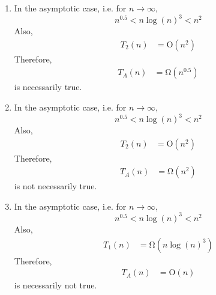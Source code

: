 \documentclass[fleqn, a4paper, 11pt, oneside]{amsart}
\theoremstyle{definition}
\theoremstyle{theorem}
\begin{document}
\begin{solution}
	\begin{enumerate}[leftmargin=*]
		\item
			In the asymptotic case, i.e. for $n \to \infty$,
			\begin{equation*}
				n^{0.5} < n \log(n)^3 < n^2
			\end{equation*}
			Also,
			\begin{align*}
				T_2(n) & = \mathrm{O}\left( n^2 \right)
			\end{align*}
			Therefore,
			\begin{align*}
				T_A(n) & = \mathrm{\Omega}\left( n^{0.5} \right)
			\end{align*}
			is necessarily true.
		\item
			In the asymptotic case, i.e. for $n \to \infty$,
			\begin{equation*}
				n^{0.5} < n \log(n)^3 < n^2
			\end{equation*}
			Also,
			\begin{align*}
				T_2(n) & = \mathrm{O}\left( n^2 \right)
			\end{align*}
			Therefore,
			\begin{align*}
				T_A(n) & = \mathrm{\Omega}\left( n^2 \right)
			\end{align*}
			is not necessarily true.
		\item
			In the asymptotic case, i.e. for $n \to \infty$,
			\begin{equation*}
				n^{0.5} < n \log(n)^3 < n^2
			\end{equation*}
			Also,
			\begin{align*}
				T_1(n) & = \mathrm{\Omega}\left( n \log(n)^3 \right)
			\end{align*}
			Therefore,
			\begin{align*}
				T_A(n) & = \mathrm{O}(n)
			\end{align*}
			is necessarily not true.
	\end{enumerate}
\end{solution}
\end{document}
